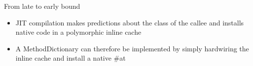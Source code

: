 \documentclass{beamer}
\begin{document}
\begin{frame}{From late to early bound}
        \begin{itemize}
            \item JIT compilation makes predictions about the class of the callee and installs native code in a polymorphic inline cache
            \item A MethodDictionary can therefore be implemented by simply hardwiring the inline cache and install a native \#at
        \end{itemize}
\end{frame}
\end{document}

